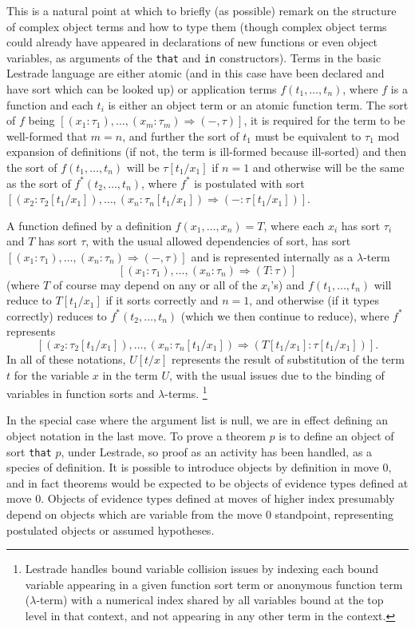 \documentclass{article}
\begin{document}
This is a natural point at which to briefly (as possible) remark on the structure of complex object terms and how to type them (though complex object terms could already have  appeared in declarations of new functions or even object variables, as arguments of the {\tt that} and {\tt in} constructors).  Terms in the basic Lestrade language are either atomic (and in this case have been declared and have sort which can be looked up) or application terms $f(t_1,\ldots,t_n)$, where $f$ is a function and each $t_i$ is either an object term or an atomic function term.  The sort of $f$ being $[(x_1:\tau_1),\ldots,(x_m:\tau_m) \Rightarrow (-,\tau)]$, it is required for the term to be well-formed
that $m=n$, and further the sort of $t_1$ must be equivalent to $\tau_1$ mod expansion of definitions (if not, the term is ill-formed because ill-sorted) and then the sort of $f(t_1,\ldots,t_n)$ will be $\tau[t_1/x_1]$ if $n=1$ and otherwise will be the same as the sort of $f^*(t_2,\ldots,t_n)$, where $f^*$ is postulated with sort $[(x_2:\tau_2[t_1/x_1]),\ldots,(x_n:\tau_n[t_1/x_1]) \Rightarrow (-:\tau[t_1/x_1])]$.

A function defined by a definition $f(x_1,\ldots,x_n)=T$, where each $x_i$ has sort $\tau_i$ and $T$ has sort $\tau$, with the usual allowed dependencies of sort, has sort $[(x_1:\tau_1),\ldots,(x_n:\tau_n) \Rightarrow (-,\tau)]$ and is represented internally as a $\lambda$-term $$[(x_1:\tau_1),\ldots,(x_n:\tau_n) \Rightarrow (T:\tau)]$$ (where $T$ of course may depend on any or all of the $x_i$'s) and $f(t_1,\ldots,t_n)$ will reduce to $T[t_1/x_1]$ if it sorts correctly
and $n=1$, and otherwise (if it types correctly) reduces to $f^*(t_2,\ldots,t_n)$ (which we then continue to reduce), where $f^*$ represents $$[(x_2:\tau_2[t_1/x_1]),\ldots,(x_n:\tau_n[t_1/x_1]) \Rightarrow (T[t_1/x_1]:\tau[t_1/x_1])].$$  In all of these notations, $U[t/x]$ represents the result of substitution of the term $t$ for the variable $x$ in the term $U$, with the usual issues due to the binding of variables in function sorts and $\lambda$-terms.  \footnote{Lestrade handles bound variable collision issues by indexing each bound variable appearing in a given function sort term or anonymous function term ($\lambda$-term) with a numerical index shared by all variables bound at the top level in that context, and not appearing in any other term in the context.}

In the special case where the argument list is null, we are in effect defining an object notation in the last move.  To prove a theorem $p$ is to define an object of sort {\tt that} $p$, under Lestrade, so proof as an activity has been handled, as a species of definition.  It is possible to introduce objects by definition in move 0, and in fact theorems would be expected to be objects of evidence types defined at move 0.  Objects of evidence types defined at moves of higher index presumably depend on objects which are variable from the move 0 standpoint, representing postulated objects or assumed hypotheses.
\end{document}
